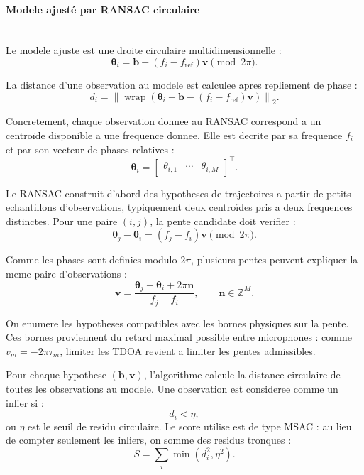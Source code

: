 \documentclass[11pt,a4paper]{article}
\begin{document}
\paragraph{Modele ajusté par RANSAC circulaire} ~\\

Le modele ajuste est une droite circulaire multidimensionnelle :
\[
  \boldsymbol{\theta}_i
    =
    \mathbf{b}
    +
    (f_i-f_{\mathrm{ref}})\mathbf{v}
    \pmod{2\pi}.
\]

La distance d'une observation au modele est calculee apres repliement de phase :
\[
  d_i
    =
    \left\|
      \operatorname{wrap}
      \left(
        \boldsymbol{\theta}_i
        -
        \mathbf{b}
        -
        (f_i-f_{\mathrm{ref}})\mathbf{v}
      \right)
    \right\|_2.
\]

Concretement, chaque observation donnee au RANSAC correspond a un centroïde
disponible a une frequence donnee. Elle est decrite par sa frequence $f_i$ et
par son vecteur de phases relatives :
\[
  \boldsymbol{\theta}_i
    =
    \begin{bmatrix}
      \theta_{i,1} & \cdots & \theta_{i,M}
    \end{bmatrix}^{\top}.
\]

Le RANSAC construit d'abord des hypotheses de trajectoires a partir de petits
echantillons d'observations, typiquement deux centroïdes pris a deux frequences
distinctes. Pour une paire $(i,j)$, la pente candidate doit verifier :
\[
  \boldsymbol{\theta}_j-\boldsymbol{\theta}_i
    =
    (f_j-f_i)\mathbf{v}
    \pmod{2\pi}.
\]

Comme les phases sont definies modulo $2\pi$, plusieurs pentes peuvent expliquer
la meme paire d'observations :
\[
  \mathbf{v}
    =
    \frac{
      \boldsymbol{\theta}_j-\boldsymbol{\theta}_i
      +
      2\pi\mathbf{n}
    }
    {f_j-f_i},
    \qquad
    \mathbf{n}\in\mathbb{Z}^{M}.
\]

On enumere les hypotheses compatibles avec les bornes physiques
sur la pente. Ces bornes proviennent du retard maximal possible entre
microphones : comme $v_m=-2\pi\tau_m$, limiter les TDOA revient a limiter les
pentes admissibles.

Pour chaque hypothese $(\mathbf{b},\mathbf{v})$, l'algorithme calcule la
distance circulaire de toutes les observations au modele. Une observation est
consideree comme un inlier si :
\[
  d_i < \eta,
\]
ou $\eta$ est le seuil de residu circulaire. Le score utilise est de type
MSAC : au lieu de compter seulement les inliers, on somme des residus tronques :
\[
  S
    =
    \sum_i
    \min(d_i^2,\eta^2).
\]
\end{document}
